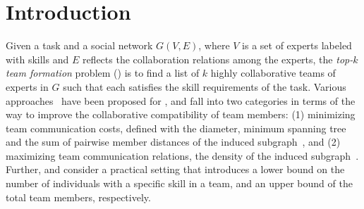 \section{Introduction}
\label{sec-intro}

Given a task and a social network $G(V, E)$, where $V$ is a set of experts labeled with skills and $E$ reflects the collaboration relations among the experts,
the {\em top-$k$ team formation} problem (\teamF) is to find a list of $k$ highly collaborative teams of experts in $G$ such that each satisfies the skill requirements of the task.
Various approaches~\cite{Lappas09,Kargar11,ArisLuca12,GajewarS12,realTeamForm13,SamikKVM12} have been proposed for \teamF,
and fall into two categories in terms of the way to improve the collaborative compatibility of team members:
 (1) minimizing team communication costs,
defined with \eg the diameter, minimum spanning tree and the sum of pairwise member distances of the induced subgraph~\cite{Lappas09,Kargar11,ArisLuca12,SamikKVM12}, and
(2) maximizing team communication relations,
\eg the density of the induced subgraph~\cite{GajewarS12,realTeamForm13}.
Further, \cite{GajewarS12} and \cite{realTeamForm13} consider a practical setting that introduces a lower bound on the number of individuals with a specific skill in a team, and an upper bound of the total team members, respectively.


